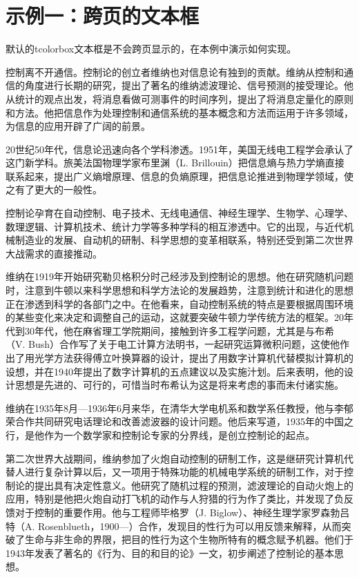 \documentclass[oneside, UTF8, fontset = adobe]{ctexart}
\begin{document}
\section{示例一：跨页的文本框}
默认的tcolorbox文本框是不会跨页显示的，在本例中演示如何实现。

\begin{tcolorbox}[enhanced, colback=GhostWhite, colframe=LightGray, coltitle=black, title=测试列表, fonttitle=\bfseries\Large, bottomrule=3ex, breakable=true]
  \setlength{\parindent}{2em}%
  \setlength{\parskip}{2ex} %
  
  控制离不开通信。控制论的创立者维纳也对信息论有独到的贡献。维纳从控制和通信的角度进行长期的研究，提出了著名的维纳滤波理论、信号预测的接受理论。他从统计的观点出发，将消息看做可测事件的时间序列，提出了将消息定量化的原则和方法。他把信息作为处理控制和通信系统的基本概念和方法而运用于许多领域，为信息的应用开辟了广阔的前景。
  
  20世纪50年代，信息论迅速向各个学科渗透。1951年，美国无线电工程学会承认了这门新学科。旅美法国物理学家布里渊（L. Brillouin）把信息熵与热力学熵直接联系起来，提出广义熵增原理、信息的负熵原理，把信息论推进到物理学领域，使之有了更大的一般性。
  
  控制论孕育在自动控制、电子技术、无线电通信、神经生理学、生物学、心理学、数理逻辑、计算机技术、统计力学等多种学科的相互渗透中。它的出现，与近代机械制造业的发展、自动机的研制、科学思想的变革相联系，特别还受到第二次世界大战需求的直接推动。
  
  维纳在1919年开始研究勒贝格积分时己经涉及到控制论的思想。他在研究随机问题时，注意到牛顿以来科学思想和科学方法论的发展趋势，注意到统计和进化的思想正在渗透到科学的各部门之中。在他看来，自动控制系统的特点是要根据周围环境的某些变化来决定和调整自己的运动，这就要突破牛顿力学传统方法的框架。20年代到30年代，他在麻省理工学院期间，接触到许多工程学问题，尤其是与布希（V. Bush）合作写了关于电工计算方法明书，一起研究运算微积问题，这使他作出了用光学方法获得傅立叶换算器的设计，提出了用数字计算机代替模拟计算机的设想，并在1940年提出了数字计算机的五点建议以及实施汁划。后来表明，他的设计思想是先进的、可行的，可惜当时布希认为这是将来考虑的事而未付诸实施。
  
  维纳在1935年8月—1936年6月来华，在清华大学电机系和数学系任教授，他与李郁荣合作共同研究电话理论和改善滤波器的设计问题。他后来写道，1935年的中国之行，是他作为一个数学家和控制论专家的分界线，是创立控制论的起点。
  
  第二次世界大战期间，维纳参加了火炮自动控制的研制工作，这是继研究计算机代替人进行复杂计算以后，又一项用于特殊功能的机械电学系统的研制工作，对于控制论的提出具有决定性意义。他研究了随机过程的预测，滤波理论的自动火炮上的应用，特别是他把火炮自动打飞机的动作与人狩猎的行为作了类比，并发现了负反馈对于控制的重要作用。他与工程师毕格罗（J. Biglow）、神经生理学家罗森勃吕特（A. Rosenblueth，1900—）合作，发现目的性行为可以用反馈来解释，从而突破了生命与非生命的界限，把目的性行为这个生物所特有的概念赋予机器。他们于1943年发表了著名的《行为、目的和目的论》一文，初步阐述了控制论的基本思想。
  

\end{tcolorbox}
\end{document}
